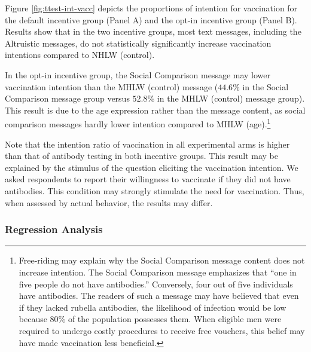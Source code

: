 \documentclass[
]{article}
\begin{document}
Figure \ref{fig:ttest-int-vacc} depicts the proportions of intention for vaccination for the default incentive group (Panel A) and the opt-in incentive group (Panel B). Results show that in the two incentive groups, most text messages, including the Altruistic messages, do not statistically significantly increase vaccination intentions compared to NHLW (control).

In the opt-in incentive group, the Social Comparison message may lower vaccination intention than the MHLW (control) message (\(44.6\)\% in the Social Comparison message group versus \(52.8\)\% in the MHLW (control) message group). This result is due to the age expression rather than the message content, as social comparison messages hardly lower intention compared to MHLW (age).\footnote{Free-riding may explain why the Social Comparison message content does not increase intention. The Social Comparison message emphasizes that ``one in five people do not have antibodies.'' Conversely, four out of five individuals have antibodies. The readers of such a message may have believed that even if they lacked rubella antibodies, the likelihood of infection would be low because 80\% of the population possesses them. When eligible men were required to undergo costly procedures to receive free vouchers, this belief may have made vaccination less beneficial.}

Note that the intention ratio of vaccination in all experimental arms is higher than that of antibody testing in both incentive groups. This result may be explained by the stimulus of the question eliciting the vaccination intention. We asked respondents to report their willingness to vaccinate if they did not have antibodies. This condition may strongly stimulate the need for vaccination. Thus, when assessed by actual behavior, the results may differ.

\hypertarget{regression-analysis}{%
\subsubsection{Regression Analysis}\label{regression-analysis}}
\end{document}
